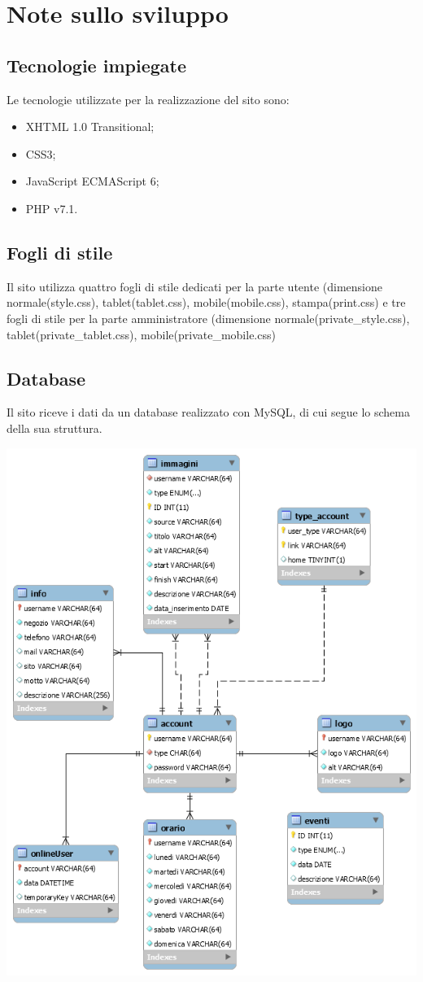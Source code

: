 \documentclass[a4paper,12pt]{article}
\begin{document}
\section{Note sullo sviluppo}
\subsection{Tecnologie impiegate}
Le tecnologie utilizzate per la realizzazione del sito sono:
\begin{itemize}
	\item XHTML 1.0 Transitional;
	\item CSS3;
	\item JavaScript ECMAScript 6;
	\item PHP v7.1.
\end{itemize}
\subsection{Fogli di stile}
Il sito utilizza quattro fogli di stile dedicati per la parte utente (dimensione normale(style.css), tablet(tablet.css), mobile(mobile.css), stampa(print.css) e tre fogli di stile per la parte amministratore (dimensione normale(private\_style.css), tablet(private\_tablet.css), mobile(private\_mobile.css)
\newpage
\subsection{Database}
Il sito riceve i dati da un database realizzato con MySQL, di cui segue lo schema della sua struttura.

\vskip1cm
\begin{center}
	\includegraphics[width=0.8\linewidth]{images/diagram}\\
\end{center}
\vskip1cm
\newpage
\end{document}
